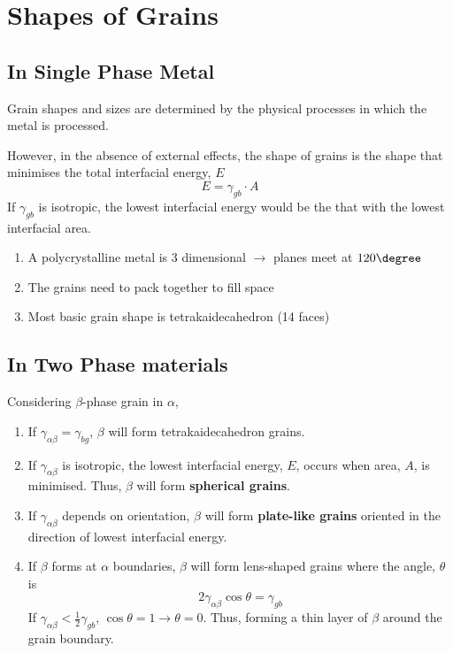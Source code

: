\section{Shapes of Grains}
\subsection{In Single Phase Metal} %
\label{sub:in_single_phase_metal}
Grain shapes and sizes are determined by the physical processes in which the metal is processed.

However, in the absence of external effects, the shape of grains is the shape that minimises the total interfacial energy, $E$
\begin{equation}
  E = \gamma_{gb}\cdot A
\end{equation}
If $\gamma_{gb}$ is isotropic, the lowest interfacial energy would be the that with the lowest interfacial area.
\begin{enumerate}
  \item A polycrystalline metal is 3 dimensional $\rightarrow$ planes meet at $120\degree$
  \item The grains need to pack together to fill space
  \item Most basic grain shape is tetrakaidecahedron (14 faces)
\end{enumerate}

\subsection{In Two Phase materials} %
\label{sub:in_two_phase_materials}
Considering $\beta$-phase grain in $\alpha$,
\begin{enumerate}
  \item If $\gamma_{\alpha\beta} = \gamma_{bg}$, $\beta$ will form tetrakaidecahedron grains.
  \item If $\gamma_{\alpha\beta}$ is isotropic, the lowest interfacial energy, $E$, occurs when area, $A$, is minimised. Thus, $\beta$ will form \textbf{spherical grains}.
  \item If $\gamma_{\alpha\beta}$ depends on orientation, $\beta$ will form \textbf{plate-like grains} oriented in the direction of lowest interfacial energy.
  \item If $\beta$ forms at $\alpha$ boundaries, $\beta$ will form lens-shaped grains where the angle, $\theta$ is
  \begin{equation}
    2\gamma_{\alpha\beta}\cos\theta = \gamma_{gb}
  \end{equation}
  If $\gamma_{\alpha\beta} < \frac{1}{2}\gamma_{gb}$, $\cos\theta = 1 \rightarrow \theta = 0$. Thus, forming a thin layer of $\beta$ around the grain boundary.
\end{enumerate}
